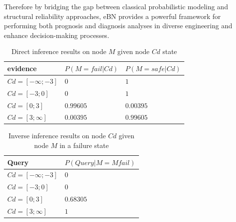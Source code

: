 Therefore by bridging the gap between classical probabilistic modeling and structural reliability approaches, eBN provides a powerful framework for performing both prognosis and diagnosis analyses in diverse engineering and enhance decision-making processes.\\ 
\begin{table}[hbt!]
    \begin{center}
        \caption{Direct inference results on node $M$ given node $Cd$ state}\label{direct_inference_tab}
        \begin{tabular}{P{3cm}P{3cm}P{3cm}}
            \textbf{evidence} & \textbf{$P(M=fail | Cd)$} & \textbf{$P(M=safe | Cd)$} \\
            \midrule
            $Cd = [-\infty;-3]$ & $0$ & $1$  \\
            $Cd = [-3;0]$ & $0$ & $1$  \\
            $Cd = [0;3]$ & $0.99605$ & $0.00395$ \\
            $Cd = [3;\infty]$ & $0.00395$ & $0.99605$\\
        \end{tabular}
    \end{center}
\end{table}

\begin{table}[hbt!]
    \begin{center}
        \caption{Inverse inference results on node $Cd$ given node $M$ in a failure state}\label{inverse_inference_tab}
        \begin{tabular}{P{3cm}P{4cm}}
            \textbf{Query} & \textbf{$P(Query | M = M fail)$} \\
            \midrule
            $Cd = [-\infty;-3]$ & $0$ \\
            $Cd = [-3;0]$ & $0$ \\
            $Cd = [0;3]$ & $0.68305$ \\
            $Cd = [3;\infty]$ & $1$ \\
        \end{tabular}
    \end{center}
\end{table}


